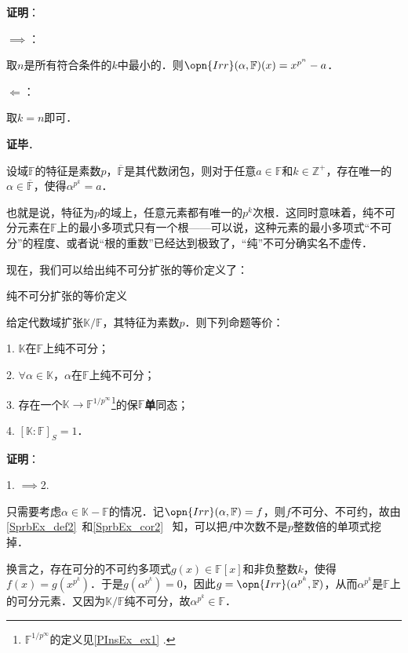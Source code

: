 \textbf{证明}：

$\implies$：

取$n$是所有符合条件的$k$中最小的．则$\opn{Irr}(\alpha, \mathbb{F})(x) = x^{p^n}-a$．

$\Leftarrow$：

取$k=n$即可．

\textbf{证毕}．

\begin{corollary}{}\label{PInsEx_cor1}
设域$\mathbb{F}$的特征是素数$p$，$\overline{\mathbb{F}}$是其代数闭包，则对于任意$a\in\mathbb{F}$和$k\in\mathbb{Z}^+$，存在唯一的$\alpha\in\overline{\mathbb{F}}$，使得$\alpha^{p^k}=a$．
\end{corollary}

也就是说，特征为$p$的域上，任意元素都有唯一的$p^k$次根．这同时意味着，纯不可分元素在$\mathbb{F}$上的最小多项式只有一个根——可以说，这种元素的最小多项式“不可分”的程度、或者说“根的重数”已经达到极致了，“纯”不可分确实名不虚传．


现在，我们可以给出纯不可分扩张的等价定义了：




\begin{theorem}{纯不可分扩张的等价定义}\label{PInsEx_the1}


给定代数域扩张$\mathbb{K}/\mathbb{F}$，其特征为素数$p$．则下列命题等价：

1. $\mathbb{K}$在$\mathbb{F}$上纯不可分；

2. $\forall \alpha\in\mathbb{K}$，$\alpha$在$\mathbb{F}$上纯不可分；

3. 存在一个$\mathbb{K}\to\mathbb{F}^{1/p^\infty}$\footnote{$\mathbb{F}^{1/p^\infty}$的定义见\autoref{PInsEx_ex1} .}的保$\mathbb{F}$\textbf{单}同态；

4. $[\mathbb{K}:\mathbb{F}]_S=1$．


\end{theorem}

\textbf{证明}：

1. $\implies$2. 

只需要考虑$\alpha\in\mathbb{K}-\mathbb{F}$的情况．记$\opn{Irr}(\alpha, \mathbb{F})=f$，则$f$不可分、不可约，故由\autoref{SprbEx_def2}~和\autoref{SprbEx_cor2}~ 知，可以把$f$中次数不是$p$整数倍的单项式挖掉．

换言之，存在可分的不可约多项式$g(x)\in\mathbb{F}[x]$和非负整数$k$，使得$f(x)=g(x^{p^k})$．于是$g(\alpha^{p^k})=0$，因此$g=\opn{Irr}(\alpha^{p^k}, \mathbb{F})$，从而$\alpha^{p^k}$是$\mathbb{F}$上的可分元素．又因为$\mathbb{K}/\mathbb{F}$纯不可分，故$\alpha^{p^k}\in\mathbb{F}$．


